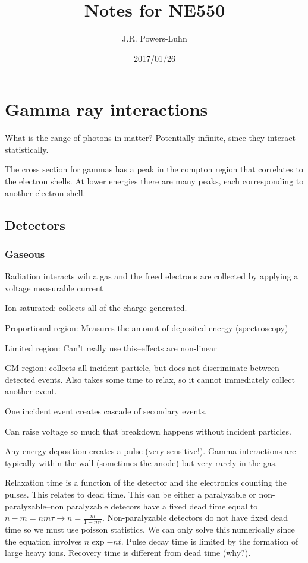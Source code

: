 \documentclass{article}
\title{Notes for NE550}
\author{J.R. Powers-Luhn}
\date{2017/01/26}
\begin{document}
\section{Gamma ray interactions}
What is the range of photons in matter? Potentially infinite, since they interact statistically.

The cross section for gammas has a peak in the compton region that correlates to the electron shells. At lower energies there are many peaks, each corresponding to another electron shell.

\subsection{Detectors}
\subsubsection{Gaseous}
Radiation interacts wih a gas and the freed electrons are collected by applying a voltage \rightarrow measurable current

Ion-saturated: collects all of the charge generated.

Proportional region: Measures the amount of deposited energy (spectroscopy)

Limited region: Can't really use this--effects are non-linear

GM region: collects all incident particle, but does not discriminate between detected events. Also takes some time to relax, so it cannot immediately collect another event.

One incident event creates cascade of secondary events. 

Can raise voltage so much that breakdown happens without incident particles.

Any energy deposition creates a pulse (very sensitive!). Gamma interactions are typically within the wall (sometimes the anode) but very rarely in the gas.

Relaxation time is a function of the detector and the electronics counting the pulses. This relates to dead time. This can be either a paralyzable or non-paralyzable--non paralyzable detecors have a fixed dead time equal to $ n - m = n m \tau \rightarrow n=\frac{m}{1-m \tau} $. Non-paralyzable detectors do not have fixed dead time so we must use poisson statistics. We can only solve this numerically since the equation involves $ n \exp{-n t} $. Pulse decay time is limited by the formation of large heavy ions. Recovery time is different from dead time (why?).
\end{document}
